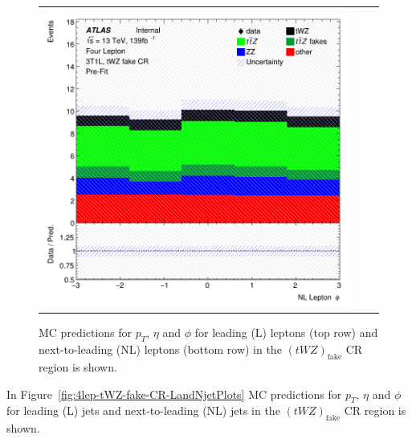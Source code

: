 \begin{figure}[htbp]
\begin{tabular}{ccc}
    \includegraphics[width=.3\textwidth]{figures/PreFitPlots/lep4_tWZ_3T1L_NL_lepton_phi.png} \\

  \end{tabular}
    \caption{MC predictions for $p_{T}$, $\eta$ and $\phi$ for leading (L) leptons (top row) and next-to-leading (NL) leptons (bottom row) in the $(tWZ)_{\text{fake}}$ CR region  is shown.}
  \label{fig:4lep-tWZ-fake-CR-leptonPlots}
\end{figure}

In Figure~\ref{fig:4lep-tWZ-fake-CR-LandNjetPlots} MC predictions for $p_{T}$, $\eta$ and $\phi$ for leading (L) jets and next-to-leading (NL) jets in the $(tWZ)_{\text{fake}}$ CR region is shown.

